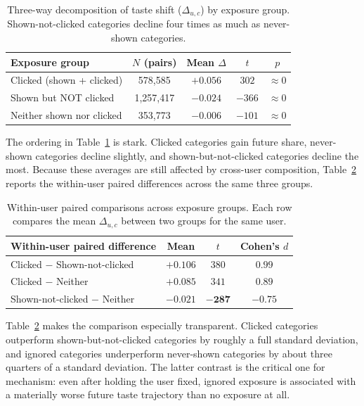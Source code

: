 \documentclass[11pt]{article}
\begin{document}
\begin{table}[ht]
\centering
\caption{Three-way decomposition of taste shift ($\Delta_{u,c}$) by exposure group. Shown-not-clicked categories decline four times as much as never-shown categories.}
\label{tab:threeway}
\begin{tabular}{lcccc}
\toprule
Exposure group & $N$ (pairs) & Mean $\Delta$ & $t$ & $p$ \\
\midrule
Clicked (shown + clicked) & 578,585 & $+0.056$ & $302$ & $\approx 0$ \\
Shown but NOT clicked & 1,257,417 & $-0.024$ & $-366$ & $\approx 0$ \\
Neither shown nor clicked & 353,773 & $-0.006$ & $-101$ & $\approx 0$ \\
\bottomrule
\end{tabular}
\end{table}
\FloatBarrier

The ordering in Table~\ref{tab:threeway} is stark. Clicked categories gain future share, never-shown categories decline slightly, and shown-but-not-clicked categories decline the most. Because these averages are still affected by cross-user composition, Table~\ref{tab:paired} reports the within-user paired differences across the same three groups.

\begin{table}[ht]
\centering
\caption{Within-user paired comparisons across exposure groups. Each row compares the mean $\Delta_{u,c}$ between two groups for the same user.}
\label{tab:paired}
\begin{tabular}{lccc}
\toprule
Within-user paired difference & Mean & $t$ & Cohen's $d$ \\
\midrule
Clicked $-$ Shown-not-clicked & $+0.106$ & $380$ & $0.99$ \\
Clicked $-$ Neither & $+0.085$ & $341$ & $0.89$ \\
Shown-not-clicked $-$ Neither & $\mathbf{-0.021}$ & $\mathbf{-287}$ & $\mathbf{-0.75}$ \\
\bottomrule
\end{tabular}
\end{table}
\FloatBarrier

Table~\ref{tab:paired} makes the comparison especially transparent. Clicked categories outperform shown-but-not-clicked categories by roughly a full standard deviation, and ignored categories underperform never-shown categories by about three quarters of a standard deviation. The latter contrast is the critical one for mechanism: even after holding the user fixed, ignored exposure is associated with a materially worse future taste trajectory than no exposure at all.
\end{document}
